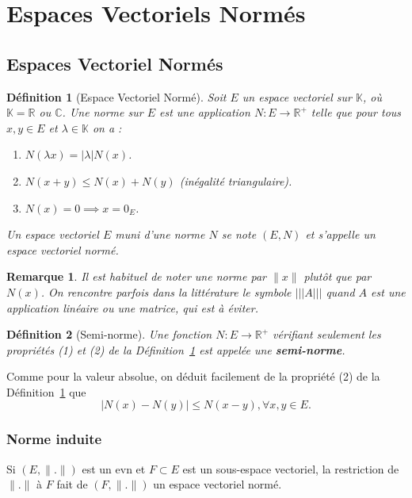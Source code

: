 \documentclass{article}
\newtheorem{definition}{Définition}
\newtheorem{remark}{Remarque}
\begin{document}
\sloppy

\section{Espaces Vectoriels Normés}

\subsection{Espaces Vectoriel Normés}

\begin{definition}[Espace Vectoriel Normé]
\label{def:evn}
Soit $E$ un espace vectoriel sur $\mathbb{K}$, où $\mathbb{K} = \mathbb{R}$ ou $\mathbb{C}$. Une norme sur $E$ est une application $N: E \rightarrow \mathbb{R}^+$ telle que pour tous $x, y \in E$ et $\lambda \in \mathbb{K}$ on a :
\begin{enumerate}
    \item $N(\lambda x) = |\lambda| N(x)$.
    \item $N(x+y) \leq N(x) + N(y)$ (inégalité triangulaire).
    \item $N(x) = 0 \implies x = 0_E$.
\end{enumerate}
Un espace vectoriel $E$ muni d'une norme $N$ se note $(E, N)$ et s'appelle un espace vectoriel normé.
\end{definition}

\begin{remark}
Il est habituel de noter une norme par $\|x\|$ plutôt que par $N(x)$. On rencontre parfois dans la littérature le symbole $|||A|||$ quand $A$ est une application linéaire ou une matrice, qui est à éviter.
\end{remark}

\begin{definition}[Semi-norme]
Une fonction $N: E \rightarrow \mathbb{R}^+$ vérifiant seulement les propriétés (1) et (2) de la Définition~\ref{def:evn} est appelée une \textbf{semi-norme}.
\end{definition}

Comme pour la valeur absolue, on déduit facilement de la propriété (2) de la Définition~\ref{def:evn} que
\begin{equation}
    |N(x) - N(y)| \leq N(x-y), \forall x, y \in E.
\end{equation}

\subsubsection{Norme induite}
Si $(E, \|.\|)$ est un evn et $F \subset E$ est un sous-espace vectoriel, la restriction de $\|.\|$ à $F$ fait de $(F, \|.\|)$ un espace vectoriel normé.
\end{document}
